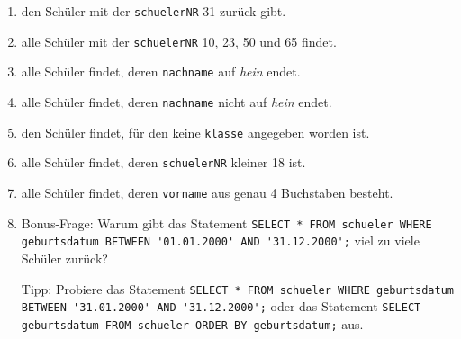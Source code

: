 \begin{Exercise}[title={Erstelle ein SELECT-Statement mit WHERE-Klausel, das}, label=Where]
	\begin{enumerate}
		\item den Schüler mit der \lstinline!schuelerNR! 31 zurück gibt.
		\item alle Schüler mit der \lstinline!schuelerNR! 10, 23, 50 und 65 findet.
		\item alle Schüler findet, deren \lstinline!nachname! auf \textit{hein} endet.
		\item alle Schüler findet, deren \lstinline!nachname! nicht auf \textit{hein} endet.
		\item den Schüler findet, für den keine \lstinline!klasse! angegeben worden ist.
		\item alle Schüler findet, deren \lstinline!schuelerNR! kleiner 18 ist.
		\item alle Schüler findet, deren \lstinline!vorname! aus genau 4 Buchstaben besteht.
		\item Bonus-Frage: Warum gibt das Statement \lstinline[breaklines=true]!SELECT * FROM schueler WHERE geburtsdatum BETWEEN '01.01.2000' AND '31.12.2000';! viel zu viele Schüler zurück?

		Tipp: Probiere das Statement \lstinline[breaklines=true]!SELECT * FROM schueler WHERE geburtsdatum BETWEEN '31.01.2000' AND '31.12.2000';! oder das Statement \lstinline!SELECT geburtsdatum FROM schueler ORDER BY geburtsdatum;! aus.
	\end{enumerate}
\end{Exercise}
